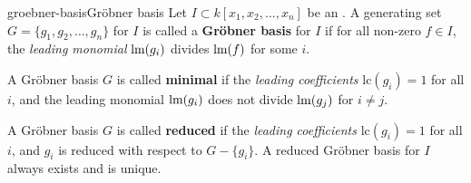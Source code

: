 \begin{topic}{groebner-basis}{Gröbner basis}
    Let $I \subset k[x_1, x_2, \ldots, x_n]$ be an . A generating set $G = \{ g_1, g_2, \ldots, g_n \}$ for $I$ is called a \textbf{Gröbner basis} for $I$ if for all non-zero $f \in I$, the \textit{leading monomial} $\textup{lm}(g_i)$ divides $\textup{lm}(f)$ for some $i$.
    
    A Gröbner basis $G$ is called \textbf{minimal} if the \textit{leading coefficients} $\text{lc}(g_i) = 1$ for all $i$, and the leading monomial $\textup{lm}(g_i)$ does not divide $\textup{lm}(g_j)$ for $i \ne j$.
    
    A Gröbner basis $G$ is called \textbf{reduced} if the \textit{leading coefficients} $\text{lc}(g_i) = 1$ for all $i$, and $g_i$ is reduced with respect to $G - \{ g_i \}$. A reduced Gröbner basis for $I$ always exists and is unique.
\end{topic}
